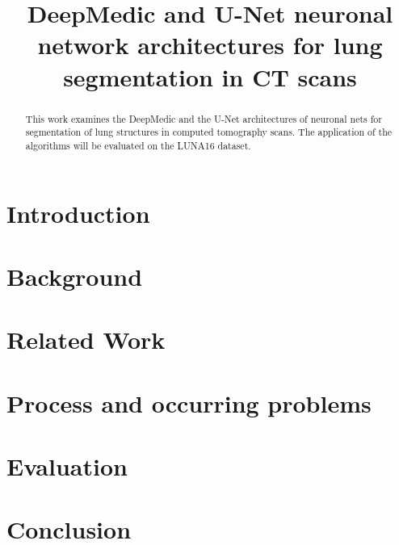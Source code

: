 \documentclass[conference]{IEEEtran}
\begin{document}
\title{DeepMedic and U-Net neuronal network architectures for lung segmentation in CT scans}

\author{
	\and
	\and
	\and
}


\maketitle

\begin{abstract}
This work examines the DeepMedic and the U-Net architectures of neuronal nets for segmentation of lung structures in computed tomography scans. The application of the algorithms will be evaluated on the LUNA16 dataset.
\end{abstract}

\section{Introduction}



\section{Background}


\section{Related Work}


\section{Process and occurring problems}


\section{Evaluation}


\section{Conclusion}




\end{document}
